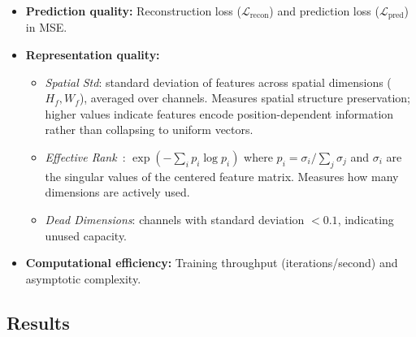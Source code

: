 \documentclass{article}
\begin{document}
\begin{itemize}
    \item \textbf{Prediction quality:} Reconstruction loss ($\mathcal{L}_\text{recon}$) and prediction loss ($\mathcal{L}_\text{pred}$) in MSE.
    \item \textbf{Representation quality:}
    \begin{itemize}
        \item \emph{Spatial Std}: standard deviation of features across spatial dimensions ($H_f, W_f$), averaged over channels. Measures spatial structure preservation; higher values indicate features encode position-dependent information rather than collapsing to uniform vectors.
        \item \emph{Effective Rank}~\cite{roy2007effectiverank}: $\exp(-\sum_i p_i \log p_i)$ where $p_i = \sigma_i / \sum_j \sigma_j$ and $\sigma_i$ are the singular values of the centered feature matrix. Measures how many dimensions are actively used.
        \item \emph{Dead Dimensions}: channels with standard deviation $< 0.1$, indicating unused capacity.
    \end{itemize}
    \item \textbf{Computational efficiency:} Training throughput (iterations/second) and asymptotic complexity.
\end{itemize}

\subsection{Results}
\end{document}
